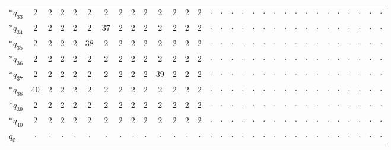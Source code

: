 \begin{longtable}{@{}l|*{30}{c}@{}}
$\ast$$q_{33}$ & 2 & 2 & 2 & 2 & 2 & 2 & 2 & 2 & 2 & 2 & 2 & 2 & 2 & $\cdot$ & $\cdot$ & $\cdot$ & $\cdot$ & $\cdot$ & $\cdot$ & $\cdot$ & $\cdot$ & $\cdot$ & $\cdot$ & $\cdot$ & $\cdot$ & $\cdot$ & $\cdot$ & $\cdot$ & $\cdot$ & $\cdot$ \\
$\ast$$q_{34}$ & 2 & 2 & 2 & 2 & 2 & 37 & 2 & 2 & 2 & 2 & 2 & 2 & 2 & $\cdot$ & $\cdot$ & $\cdot$ & $\cdot$ & $\cdot$ & $\cdot$ & $\cdot$ & $\cdot$ & $\cdot$ & $\cdot$ & $\cdot$ & $\cdot$ & $\cdot$ & $\cdot$ & $\cdot$ & $\cdot$ & $\cdot$ \\
$\ast$$q_{35}$ & 2 & 2 & 2 & 2 & 38 & 2 & 2 & 2 & 2 & 2 & 2 & 2 & 2 & $\cdot$ & $\cdot$ & $\cdot$ & $\cdot$ & $\cdot$ & $\cdot$ & $\cdot$ & $\cdot$ & $\cdot$ & $\cdot$ & $\cdot$ & $\cdot$ & $\cdot$ & $\cdot$ & $\cdot$ & $\cdot$ & $\cdot$ \\
$\ast$$q_{36}$ & 2 & 2 & 2 & 2 & 2 & 2 & 2 & 2 & 2 & 2 & 2 & 2 & 2 & $\cdot$ & $\cdot$ & $\cdot$ & $\cdot$ & $\cdot$ & $\cdot$ & $\cdot$ & $\cdot$ & $\cdot$ & $\cdot$ & $\cdot$ & $\cdot$ & $\cdot$ & $\cdot$ & $\cdot$ & $\cdot$ & $\cdot$ \\
$\ast$$q_{37}$ & 2 & 2 & 2 & 2 & 2 & 2 & 2 & 2 & 2 & 39 & 2 & 2 & 2 & $\cdot$ & $\cdot$ & $\cdot$ & $\cdot$ & $\cdot$ & $\cdot$ & $\cdot$ & $\cdot$ & $\cdot$ & $\cdot$ & $\cdot$ & $\cdot$ & $\cdot$ & $\cdot$ & $\cdot$ & $\cdot$ & $\cdot$ \\
$\ast$$q_{38}$ & 40 & 2 & 2 & 2 & 2 & 2 & 2 & 2 & 2 & 2 & 2 & 2 & 2 & $\cdot$ & $\cdot$ & $\cdot$ & $\cdot$ & $\cdot$ & $\cdot$ & $\cdot$ & $\cdot$ & $\cdot$ & $\cdot$ & $\cdot$ & $\cdot$ & $\cdot$ & $\cdot$ & $\cdot$ & $\cdot$ & $\cdot$ \\
$\ast$$q_{39}$ & 2 & 2 & 2 & 2 & 2 & 2 & 2 & 2 & 2 & 2 & 2 & 2 & 2 & $\cdot$ & $\cdot$ & $\cdot$ & $\cdot$ & $\cdot$ & $\cdot$ & $\cdot$ & $\cdot$ & $\cdot$ & $\cdot$ & $\cdot$ & $\cdot$ & $\cdot$ & $\cdot$ & $\cdot$ & $\cdot$ & $\cdot$ \\
$\ast$$q_{40}$ & 2 & 2 & 2 & 2 & 2 & 2 & 2 & 2 & 2 & 2 & 2 & 2 & 2 & $\cdot$ & $\cdot$ & $\cdot$ & $\cdot$ & $\cdot$ & $\cdot$ & $\cdot$ & $\cdot$ & $\cdot$ & $\cdot$ & $\cdot$ & $\cdot$ & $\cdot$ & $\cdot$ & $\cdot$ & $\cdot$ & $\cdot$ \\
$q_\emptyset$ & $\cdot$ & $\cdot$ & $\cdot$ & $\cdot$ & $\cdot$ & $\cdot$ & $\cdot$ & $\cdot$ & $\cdot$ & $\cdot$ & $\cdot$ & $\cdot$ & $\cdot$ & $\cdot$ & $\cdot$ & $\cdot$ & $\cdot$ & $\cdot$ & $\cdot$ & $\cdot$ & $\cdot$ & $\cdot$ & $\cdot$ & $\cdot$ & $\cdot$ & $\cdot$ & $\cdot$ & $\cdot$ & $\cdot$ & $\cdot$ \\
\end{longtable}
